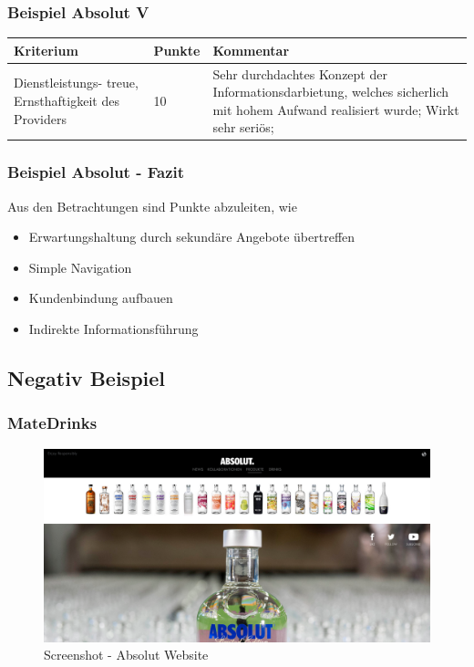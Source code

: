 \begin{frame}
	\frametitle{Beispiel Absolut V}
	\begin{tabular}{|p{}|l|p{6cm}|}
	\hline
	  Kriterium & Punkte & Kommentar \\ \hline
	  Dienstleistungs- treue, Ernsthaftigkeit des Providers & 10 & Sehr durchdachtes Konzept der Informationsdarbietung, welches sicherlich mit hohem Aufwand realisiert wurde; Wirkt sehr seriös; \\ \hline
 	\end{tabular}
\end{frame}

\begin{frame}\frametitle{Beispiel Absolut - Fazit}
	Aus den Betrachtungen sind Punkte abzuleiten, wie 
	\begin{itemize}
		\item Erwartungshaltung durch sekundäre Angebote übertreffen
		\item Simple Navigation
		\item Kundenbindung aufbauen
		\item Indirekte Informationsführung
	\end{itemize}
\end{frame}

\subsection{Negativ Beispiel}
\begin{frame}
	\frametitle{MateDrinks}
	\begin{figure}
	\includegraphics[scale=0.2]{bilder/absolut.png}
	\caption[Screenshot - Absolut Vodka]{Screenshot - Absolut Website}
	\label{labelname}
	\end{figure}
\end{frame}

